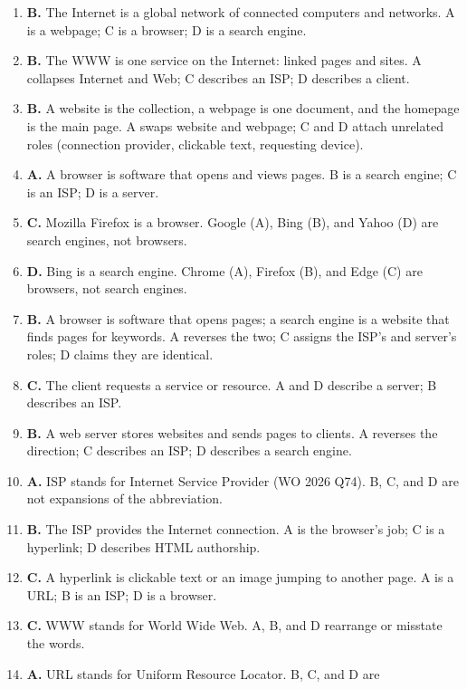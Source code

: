 \begin{enumerate}[label=\textbf{Q\arabic*.}, leftmargin=*]
\item \textbf{B.} The Internet is a global network of connected computers and
  networks. A is a webpage; C is a browser; D is a search engine.
\item \textbf{B.} The WWW is one service on the Internet: linked pages and
  sites. A collapses Internet and Web; C describes an ISP; D describes a
  client.
\item \textbf{B.} A website is the collection, a webpage is one document, and
  the homepage is the main page. A swaps website and webpage; C and D attach
  unrelated roles (connection provider, clickable text, requesting device).
\item \textbf{A.} A browser is software that opens and views pages. B is a
  search engine; C is an ISP; D is a server.
\item \textbf{C.} Mozilla Firefox is a browser. Google (A), Bing (B), and
  Yahoo (D) are search engines, not browsers.
\item \textbf{D.} Bing is a search engine. Chrome (A), Firefox (B), and Edge
  (C) are browsers, not search engines.
\item \textbf{B.} A browser is software that opens pages; a search engine is
  a website that finds pages for keywords. A reverses the two; C assigns the
  ISP's and server's roles; D claims they are identical.
\item \textbf{C.} The client requests a service or resource. A and D describe
  a server; B describes an ISP.
\item \textbf{B.} A web server stores websites and sends pages to clients. A
  reverses the direction; C describes an ISP; D describes a search engine.
\item \textbf{A.} ISP stands for Internet Service Provider (WO 2026 Q74).
  B, C, and D are not expansions of the abbreviation.
\item \textbf{B.} The ISP provides the Internet connection. A is the
  browser's job; C is a hyperlink; D describes HTML authorship.
\item \textbf{C.} A hyperlink is clickable text or an image jumping to
  another page. A is a URL; B is an ISP; D is a browser.
\item \textbf{C.} WWW stands for World Wide Web. A, B, and D rearrange or
  misstate the words.
\item \textbf{A.} URL stands for Uniform Resource Locator. B, C, and D are

\end{enumerate}
